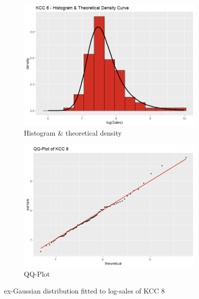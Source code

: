  \begin{figure}[H]
\centering
\begin{subfigure}{.45\textwidth}
  \centering
  \includegraphics[width=\linewidth]{figures/kcc_8_density.png}
  \caption{Histogram \& theoretical density}
  \label{fig:kcc_8_density}
\end{subfigure}
\begin{subfigure}{.45\textwidth}
  \centering
  \includegraphics[width=\linewidth]{figures/kcc_8_qqplot.png}
  \caption{QQ-Plot}
  \label{fig:kcc_8_qqplot}
\end{subfigure}
\caption{ex-Gaussian distribution fitted to log-sales of \ac{KCC} 8}
\label{fig:kcc_8_margin}
\end{figure} 


